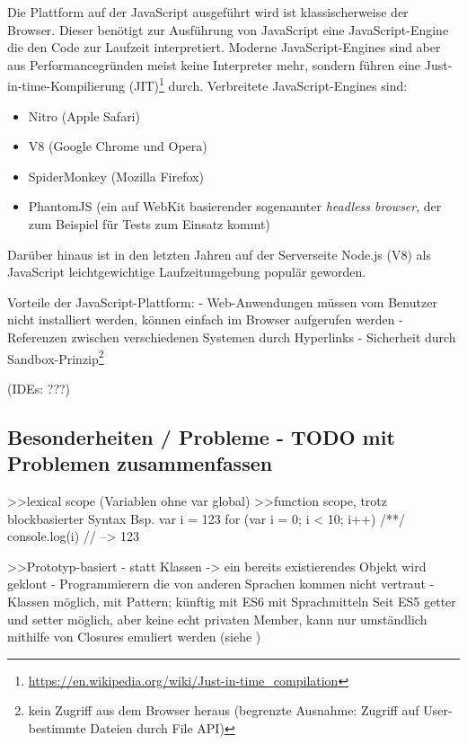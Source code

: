\documentclass[a4paper, 12pt, hidelinks, listof=totoc, listoftables=totoc, bibliography=totoc]{scrreprt}
\begin{document}
Die Plattform auf der JavaScript ausgeführt wird ist klassischerweise der Browser. Dieser benötigt zur Ausführung von JavaScript eine JavaScript-Engine die den Code zur Laufzeit interpretiert. Moderne JavaScript-Engines sind aber aus Performancegründen meist keine Interpreter mehr, sondern führen eine Just-in-time-Kompilierung (JIT)\footnote{
	\url{https://en.wikipedia.org/wiki/Just-in-time_compilation}
} durch. Verbreitete JavaScript-Engines sind:

\begin{itemize}
	\item Nitro (Apple Safari)
	\item V8 (Google Chrome und Opera)
	\item SpiderMonkey (Mozilla Firefox)
	\item PhantomJS (ein auf WebKit basierender sogenannter \textit{headless browser}, der zum Beispiel für Tests zum Einsatz kommt)
\end{itemize}

Darüber hinaus ist in den letzten Jahren auf der Serverseite Node.js (V8) als JavaScript leichtgewichtige Laufzeitumgebung populär geworden.

Vorteile der JavaScript-Plattform:
- Web-Anwendungen müssen vom Benutzer nicht installiert werden, können einfach im Browser aufgerufen werden
- Referenzen zwischen verschiedenen Systemen durch Hyperlinks
- Sicherheit durch Sandbox-Prinzip\footnote{
	kein Zugriff aus dem Browser heraus (begrenzte Ausnahme: Zugriff auf User-bestimmte Dateien durch File API)}
\cite[\#Javascript-the-platform]{haoyi.HOS}

(IDEs: ???)


\subsection{Besonderheiten / Probleme - TODO mit Problemen zusammenfassen}

>>lexical scope (Variablen ohne var global)
>>function scope, trotz blockbasierter Syntax
Bsp.
var i = 123
for (var i = 0; i < 10; i++) { /**/ }
console.log(i) // --> 123

>>Prototyp-basiert
- statt Klassen
-> ein bereits existierendes Objekt wird geklont
- Programmierern die von anderen Sprachen kommen nicht vertraut
- Klassen möglich, mit Pattern; künftig mit ES6 mit Sprachmitteln
Seit ES5 getter und setter möglich, aber keine echt privaten Member, kann nur umständlich mithilfe von Closures emuliert werden
(siehe \cite[S. 226]{flanagan2011.JDG})
\end{document}
